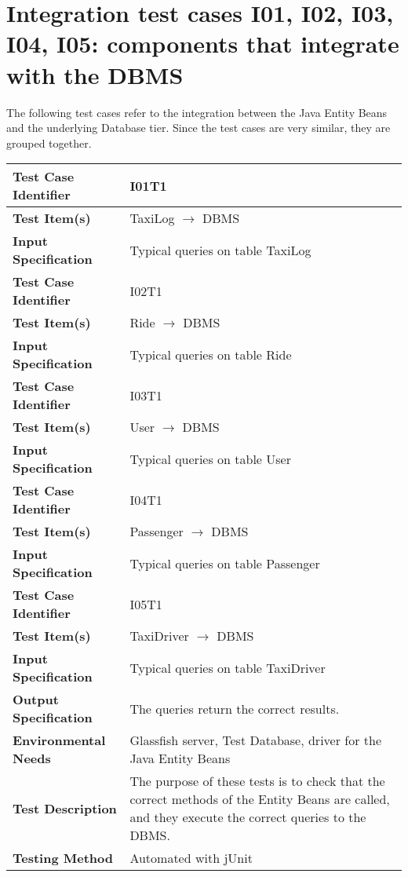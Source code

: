\newpage

\section{Integration test cases I01, I02, I03, I04, I05: components that integrate with the DBMS}

The following test cases refer to the integration between the Java Entity Beans and the underlying Database tier.
Since the test cases are very similar, they are grouped together.

\vspace{2em}

\begin{tabular}{l p{}}
    \hline
    \textbf{Test Case Identifier} & I01T1\\
    \hline
    \textbf{Test Item(s)} & TaxiLog $\rightarrow$ DBMS \\
    \hline
    \textbf{Input Specification} & Typical queries on table TaxiLog \\
    \hline
    \hline
    \textbf{Test Case Identifier} & I02T1\\
    \hline
    \textbf{Test Item(s)} & Ride $\rightarrow$ DBMS \\
    \hline
    \textbf{Input Specification} & Typical queries on table Ride \\
    \hline
    \hline
    \textbf{Test Case Identifier} & I03T1\\
    \hline
    \textbf{Test Item(s)} & User $\rightarrow$ DBMS \\
    \hline
    \textbf{Input Specification} & Typical queries on table User \\
    \hline
    \hline
    \textbf{Test Case Identifier} & I04T1\\
    \hline
    \textbf{Test Item(s)} & Passenger $\rightarrow$ DBMS \\
    \hline
    \textbf{Input Specification} & Typical queries on table Passenger \\
    \hline
    \hline
    \textbf{Test Case Identifier} & I05T1\\
    \hline
    \textbf{Test Item(s)} & TaxiDriver $\rightarrow$ DBMS \\
    \hline
    \textbf{Input Specification} & Typical queries on table TaxiDriver \\
    \hline
    \hline
    \textbf{Output Specification} & The queries return the correct results. \\
    \hline
    \textbf{Environmental Needs} & Glassfish server, Test Database, driver for the Java Entity Beans \\
    \hline
    \textbf{Test Description} & The purpose of these tests is to check that the correct methods of the Entity Beans are called, and they execute the correct queries to the DBMS.  \\
    \hline
    \textbf{Testing Method} & Automated with jUnit \\
    \hline
\end{tabular}


